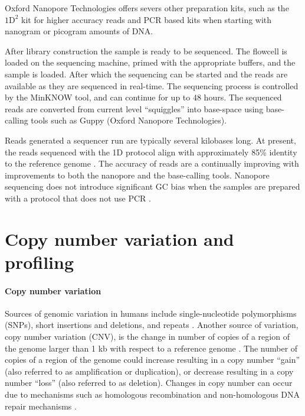 Oxford Nanopore Technologies offers severs other preparation kits, such
as the $\text{1D}^2$ kit for higher accuracy reads and PCR based kits when
starting with nanogram or picogram amounts of DNA.

After library construction the sample is ready to be sequenced. The
flowcell is loaded on the sequencing machine, primed with the appropriate
buffers, and the sample is loaded. After which the sequencing can be
started and the reads are available as they are sequenced in real-time.
%
The sequencing process is controlled by the MinKNOW tool, and can
continue for up to 48 hours.
The sequenced reads are converted from current level ``squiggles'' into
base-space using base-calling tools such as Guppy (Oxford Nanopore
Technologies).

Reads generated a sequencer run are typically several kilobases long.
At present, the reads sequenced with the 1D protocol align
with approximately 85\% identity to the reference genome
\citep{bowden2019sequencing,jain2018nanopore,carter2017robust}.
The accuracy of reads are a continually improving with improvements to
both the nanopore and the base-calling tools.
Nanopore sequencing does not introduce significant GC bias when the
samples are prepared with a protocol that does not use PCR
\citep{carter2017robust}.


\section{Copy number variation and profiling}
\paragraph{Copy number variation}
Sources of genomic variation in humans include
single-nucleotide polymorphisms (SNPs), short insertions and deletions, and
repeats \citep{}.
Another source of variation, copy number variation (CNV), is the change in
number of copies of a region of the genome larger than 1 kb with
respect to a reference genome
\citep{redon2006global,feuk2006structural}.  The number of copies of a
region of the genome could increase resulting in a copy number ``gain''
(also referred to as amplification or duplication), or decrease resulting in a
copy number ``loss'' (also referred to as deletion).
Changes in copy number can occur due to mechanisms such as homologous
recombination and non-homologous DNA repair mechanisms
\citep{hastings2009mechanisms,van2011origins,stankiewicz2010structural}.

